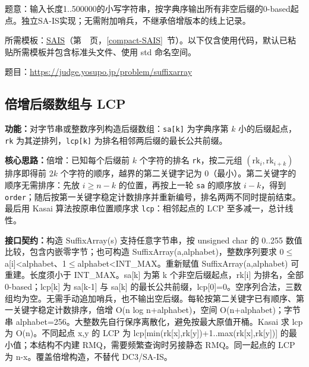 \label{usage-example-241}

题意：输入长度1..500000的小写字符串，按字典序输出所有非空后缀的0-based起点。独立SA-IS实现；无需附加哨兵，不继承倍增版本的线上记录。

所需模板：\hyperref[compact-SAIS]{SAIS}（第~\pageref{compact-SAIS}~页，\ref{compact-SAIS}~节）。以下仅含使用代码，默认已粘贴所需模板并包含标准头文件、使用 std 命名空间。

题目：\url{https://judge.yosupo.jp/problem/suffixarray}



\newpage

\subsection{倍增后缀数组与 LCP}\label{compact-SuffixArray}

\noindent\textbf{功能：}\allowbreak 对字节串或整数序列构造后缀数组：\texttt{sa[k]} 为字典序第 $k$ 小的后缀起点，\texttt{rk} 为其逆排列，\texttt{lcp[k]} 为排名相邻两后缀的最长公共前缀。

\textbf{核心思路：}\allowbreak 倍增：已知每个后缀前 $k$ 个字符的排名 \texttt{rk}，按二元组 $(\mathrm{rk}_i,\mathrm{rk}_{i+k})$ 排序即得前 $2k$ 个字符的顺序，越界的第二关键字记为 0（最小）。第二关键字的顺序无需排序：先放 $i\ge n-k$ 的位置，再按上一轮 \texttt{sa} 的顺序放 $i-k$，得到 \texttt{order}；随后按第一关键字稳定计数排序并重新编号，排名两两不同时提前结束。最后用 Kasai 算法按原串位置顺序求 \texttt{lcp}：相邻起点的 LCP 至多减一，总计线性。



{\sloppy{}\noindent\textbf{接口契约：}构造 SuffixArray(s) 支持任意字节串，按 unsigned char 的 0..255 数值比较，包含内嵌零字节；也可构造 SuffixArray(a,alphabet)，整数序列要求 0$\le$a[i]<alphabet、1$\le$alphabet<INT\_MAX。重新赋值 SuffixArray(a,alphabet) 可重建。长度须小于 INT\_MAX。sa[k] 为第 k 个非空后缀起点，rk[i] 为排名，全部 0-based；lcp[k] 为 sa[k-1] 与 sa[k] 的最长公共前缀，lcp[0]=0。空序列合法，三数组均为空。无需手动追加哨兵，也不输出空后缀。每轮按第二关键字已有顺序、第一关键字稳定计数排序，倍增 O(n log n+alphabet)，空间 O(n+alphabet)；字节串 alphabet=256。大整数先自行保序离散化，避免按最大原值开桶。Kasai 求 lcp 为 O(n)。不同起点 x,y 的 LCP 为 lcp[min(rk[x],rk[y])+1..max(rk[x],rk[y])] 的最小值；本结构不内建 RMQ，需要频繁查询时另接静态 RMQ。同一起点的 LCP 为 n-x。覆盖倍增构造，不替代 DC3/SA-IS。\par}


